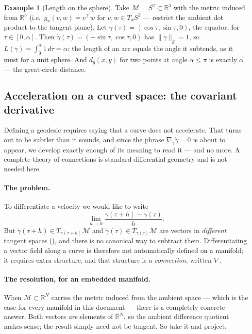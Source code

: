 \documentclass[11pt,a4paper]{report}
\theoremstyle{definition}
\newtheorem{example}[example]{Example}
\theoremstyle{remark}
\newcommand{\RR}{\mathbb R}
\begin{document}
\begin{example}[Length on the sphere]
\label{ex:sphere-length}
Take $\mathcal M=S^2\subset\RR^3$ with the metric induced from $\RR^3$
(i.e.\ $g_x(v,w)=v^\top w$ for $v,w\in T_xS^2$ --- restrict the ambient dot
product to the tangent plane). Let $\gamma(\tau)=(\cos\tau,\sin\tau,0)$, the
equator, for $\tau\in[0,\alpha]$. Then $\dot\gamma(\tau)=(-\sin\tau,\cos\tau,0)$
has $\|\dot\gamma\|_g=1$, so $L(\gamma)=\int_0^\alpha1\,d\tau=\alpha$: the
length of an arc equals the angle it subtends, as it must for a unit
sphere. And $d_g(x,y)$ for two points at angle $\alpha\le\pi$ is exactly
$\alpha$ --- the great-circle distance.
\end{example}

\subsection{Acceleration on a curved space: the covariant derivative}
\label{sec:covariant-derivative}

Defining a geodesic requires saying that a curve does not accelerate. That
turns out to be subtler than it sounds, and since the phrase
$\nabla_{\dot\gamma}\dot\gamma=0$ is about to appear, we develop exactly
enough of its meaning to read it --- and no more. A complete theory of
connections is standard differential geometry and is not needed here.

\paragraph{The problem.} To differentiate a velocity we would like to write
\[
\lim_{h\to0}\frac{\dot\gamma(\tau+h)-\dot\gamma(\tau)}{h} .
\]
But $\dot\gamma(\tau+h)\in T_{\gamma(\tau+h)}\mathcal M$ and
$\dot\gamma(\tau)\in T_{\gamma(\tau)}\mathcal M$ are vectors in
\emph{different} tangent spaces (), and there is no
canonical way to subtract them. Differentiating a vector field along a curve
is therefore not automatically defined on a manifold; it requires extra
structure, and that structure is a \emph{connection}, written $\nabla$.

\paragraph{The resolution, for an embedded manifold.} When
$\mathcal M\subset\RR^N$ carries the metric induced from the ambient space
--- which is the case for every manifold in this document --- there is a
completely concrete answer. Both vectors \emph{are} elements of $\RR^N$, so
the ambient difference quotient makes sense; the result simply need not be
tangent. So take it and project.
\end{document}
